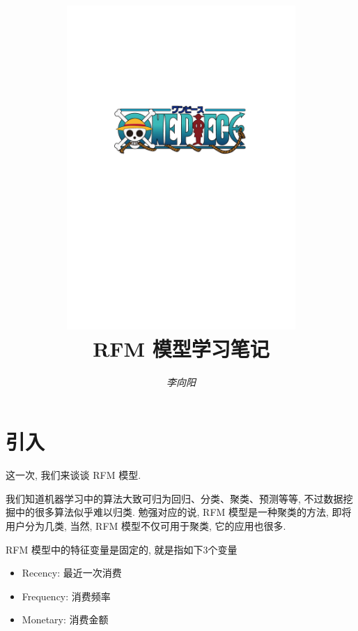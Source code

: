 \documentclass[a4paper,UTF8]{ctexart}
\theoremstyle{plain} \newtheorem{theorem}{定理}[section]
\theoremstyle{plain} \newtheorem{definition}{定义}[section]
\theoremstyle{plain} \newtheorem{lemma}{引理}[section]
\theoremstyle{plain} \newtheorem{proposition}{命题}[section]
\theoremstyle{plain} \newtheorem{example}{例}[section]
\theoremstyle{plain} \newtheorem{remark}{注}[section]
\theoremstyle{plain} \newtheorem{corollary}{推论}[section]
\begin{document}
\title{
\includegraphics[width=0.65\textwidth]{onepiece.pdf}\\
\vspace{2em}
\textbf{RFM 模型学习笔记}}
\author{\emph{李向阳} 
}
\date{}


\maketitle
\thispagestyle{empty}

\newpage


\tableofcontents

\newpage

\section{引入}
这一次, 我们来谈谈 RFM 模型.

我们知道机器学习中的算法大致可归为回归、分类、聚类、预测等等, 不过数据挖掘中的很多算法似乎难以归类. 勉强对应的说, RFM 模型是一种聚类的方法, 即将用户分为几类, 当然, RFM 模型不仅可用于聚类, 它的应用也很多.

RFM 模型中的特征变量是固定的, 就是指如下$3$个变量
\begin{itemize}
\item Recency: 最近一次消费

\item Frequency: 消费频率

\item Monetary: 消费金额
\end{itemize}
\end{document}
